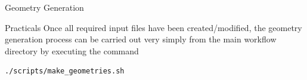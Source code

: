 \begin{section}{Geometry Generation}
\begin{subsection}{Practicals}
Once all required input files have been created/modified, the geometry generation process can
be carried out very simply from the main workflow directory by
executing the command
%
\begin{lstlisting}
./scripts/make_geometries.sh
\end{lstlisting}

\end{subsection}


\end{section}
